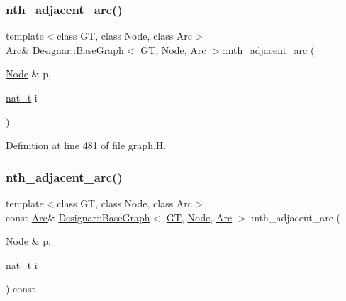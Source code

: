 \subsubsection{\texorpdfstring{nth\+\_\+adjacent\+\_\+arc()}{nth\_adjacent\_arc()}\hspace{0.1cm}{\footnotesize\ttfamily [1/2]}}
{\footnotesize\ttfamily template$<$class GT, class Node, class Arc$>$ \\
\hyperlink{namespace_designar_a3f55fb5513d62ff47cbc8f72b8e95d6f}{Arc}\& \hyperlink{class_designar_1_1_base_graph}{Designar\+::\+Base\+Graph}$<$ \hyperlink{demo-buildgraph_8_c_a3001c40d2c31ca87ed96cd7d1334a55e}{GT}, \hyperlink{namespace_designar_a5af326c65aa2bd26b26c410f2030d09e}{Node}, \hyperlink{namespace_designar_a3f55fb5513d62ff47cbc8f72b8e95d6f}{Arc} $>$\+::nth\+\_\+adjacent\+\_\+arc (\begin{DoxyParamCaption}\item[{\hyperlink{namespace_designar_a5af326c65aa2bd26b26c410f2030d09e}{Node} \&}]{p,  }\item[{\hyperlink{namespace_designar_aa72662848b9f4815e7bf31a7cf3e33d1}{nat\+\_\+t}}]{i }\end{DoxyParamCaption})\hspace{0.3cm}{\ttfamily [inline]}}



Definition at line 481 of file graph.\+H.

\mbox{\label{class_designar_1_1_base_graph_a3ca561f708fec1724d5c95192f98ef96}} 
\subsubsection{\texorpdfstring{nth\+\_\+adjacent\+\_\+arc()}{nth\_adjacent\_arc()}\hspace{0.1cm}{\footnotesize\ttfamily [2/2]}}
{\footnotesize\ttfamily template$<$class GT, class Node, class Arc$>$ \\
const \hyperlink{namespace_designar_a3f55fb5513d62ff47cbc8f72b8e95d6f}{Arc}\& \hyperlink{class_designar_1_1_base_graph}{Designar\+::\+Base\+Graph}$<$ \hyperlink{demo-buildgraph_8_c_a3001c40d2c31ca87ed96cd7d1334a55e}{GT}, \hyperlink{namespace_designar_a5af326c65aa2bd26b26c410f2030d09e}{Node}, \hyperlink{namespace_designar_a3f55fb5513d62ff47cbc8f72b8e95d6f}{Arc} $>$\+::nth\+\_\+adjacent\+\_\+arc (\begin{DoxyParamCaption}\item[{\hyperlink{namespace_designar_a5af326c65aa2bd26b26c410f2030d09e}{Node} \&}]{p,  }\item[{\hyperlink{namespace_designar_aa72662848b9f4815e7bf31a7cf3e33d1}{nat\+\_\+t}}]{i }\end{DoxyParamCaption}) const\hspace{0.3cm}{\ttfamily [inline]}}



